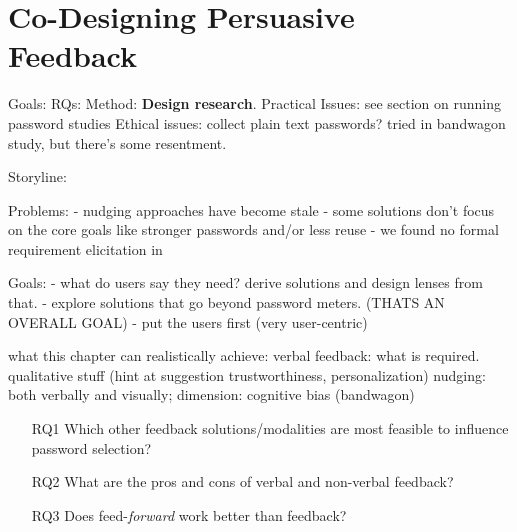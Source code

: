 \chapter[Co-Designing Persuasive Feedback] {Co-Designing Persuasive \\ Feedback}\label{chap:feedback_modalities}



Goals: 
RQs:
Method: \textbf{Design research}.
Practical Issues: see section on running password studies
Ethical issues: collect plain text passwords? tried in bandwagon study, but there's some resentment. 


Storyline:

Problems:
- nudging approaches have become stale
- some solutions don't focus on the core goals like stronger passwords and/or less reuse
- we found no formal requirement elicitation in 


Goals:
- what do users say they need? derive solutions and design lenses from that. 
- explore solutions that go beyond password meters. (THATS AN OVERALL GOAL)
- put the users first (very user-centric)


% 

what this chapter can realistically achieve: 
verbal feedback: what is required. qualitative stuff (hint at suggestion trustworthiness, personalization)
nudging: both verbally and visually; dimension: cognitive bias (bandwagon)

\begin{itemize}
	\item[RQ1] Which other feedback solutions/modalities are most feasible to influence password selection?
	\item[RQ2] What are the pros and cons of verbal and non-verbal feedback?
	\item[RQ3] Does feed-\textit{forward} work better than feedback?
\end{itemize}

